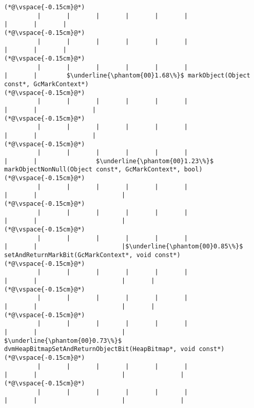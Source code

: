 \begin{lstlisting}[caption=NewDirectByteBuffer, label=profile:C2JNewDirectBuffer-512, numberbychapter=true, frame=lines, float, floatplacement=t]
(*@\vspace{-0.15cm}@*)
         |       |       |       |       |       |                       |       |       |
(*@\vspace{-0.15cm}@*)
         |       |       |       |       |       |                       |       |       |
(*@\vspace{-0.15cm}@*)
         |       |       |       |       |       |                       |       |        $\underline{\phantom{00}1.68\%}$ markObject(Object const*, GcMarkContext*)
(*@\vspace{-0.15cm}@*)
         |       |       |       |       |       |                       |       |               |
(*@\vspace{-0.15cm}@*)
         |       |       |       |       |       |                       |       |               |
(*@\vspace{-0.15cm}@*)
         |       |       |       |       |       |                       |       |                $\underline{\phantom{00}1.23\%}$ markObjectNonNull(Object const*, GcMarkContext*, bool)
(*@\vspace{-0.15cm}@*)
         |       |       |       |       |       |                       |       |                       |
(*@\vspace{-0.15cm}@*)
         |       |       |       |       |       |                       |       |                       |
(*@\vspace{-0.15cm}@*)
         |       |       |       |       |       |                       |       |                       |$\underline{\phantom{00}0.85\%}$ setAndReturnMarkBit(GcMarkContext*, void const*)
(*@\vspace{-0.15cm}@*)
         |       |       |       |       |       |                       |       |                       |       |
(*@\vspace{-0.15cm}@*)
         |       |       |       |       |       |                       |       |                       |       |
(*@\vspace{-0.15cm}@*)
         |       |       |       |       |       |                       |       |                       |        $\underline{\phantom{00}0.73\%}$ dvmHeapBitmapSetAndReturnObjectBit(HeapBitmap*, void const*)
(*@\vspace{-0.15cm}@*)
         |       |       |       |       |       |                       |       |                       |               |
(*@\vspace{-0.15cm}@*)
         |       |       |       |       |       |                       |       |                       |               |

\end{lstlisting}
